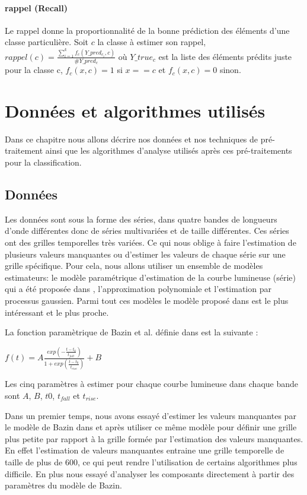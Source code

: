 \documentclass[french]{report}
\begin{document}
\subsubsection{rappel (Recall)}
Le rappel donne la proportionnalité de la bonne prédiction des éléments d'une classe particulière. Soit $c$ la classe à estimer son rappel, $rappel(c) = \frac{\sum_{i = 1}^{k} f_c(Y\_pred_{c_i}, c)}{\#Y\_pred_c}$ où $Y\_true_c$ est la liste des éléments prédits juste pour la classe c, $f_c (x, c) = 1$ si $x == c$ et $f_c (x, c) = 0$ sinon.  
\chapter{Données et algorithmes utilisés}
Dans ce chapitre nous allons décrire nos données et nos techniques de pré-traitement ainsi que les algorithmes d'analyse utilisés après ces pré-traitements pour la classification.
\section{Données}

Les données sont sous la forme des séries, dans quatre bandes de longueurs d'onde différentes donc de séries multivariées et de taille différentes. Ces séries ont des grilles temporelles très variées. Ce qui nous oblige à faire l'estimation de plusieurs valeurs manquantes ou d'estimer les valeurs de chaque série sur une grille spécifique. Pour cela, nous allons utiliser un ensemble de modèles estimateurs: le modèle paramétrique d'estimation de la courbe lumineuse (série) qui a été proposée dans \cite{bazin}, l'approximation polynomiale et l'estimation par processus gaussien. Parmi tout ces modèles le modèle proposé dans \cite{bazin} est le plus intéressant et le plus proche.  

La fonction paramètrique de Bazin et al. définie dans \cite{bazin} est la suivante :
\begin{center}
	$f(t) = A\frac{exp{\left(-\frac{t-t_0}{t_{fall}}\right)}} {1+exp{\left(\frac{t-t_0}{t_{rise}}\right)}} + B$
\end{center}
Les cinq paramètres à estimer pour chaque courbe lumineuse dans chaque bande sont $A$, $B$, $t0$, $t_{fall}$ et $t_{rise}$.   

Dans un premier temps, nous avons essayé d'estimer les valeurs manquantes par le modèle de Bazin dans \cite{bazin} et après utiliser ce même modèle pour définir une grille plus petite par rapport à la grille formée par l'estimation des valeurs manquantes. En effet l'estimation de valeurs manquantes entraine une grille temporelle de taille de plus de 600, ce qui peut rendre l'utilisation de certains algorithmes plus difficile. En plus nous essayé d'analyser les composants directement à partir des paramètres du modèle de Bazin.
\end{document}
